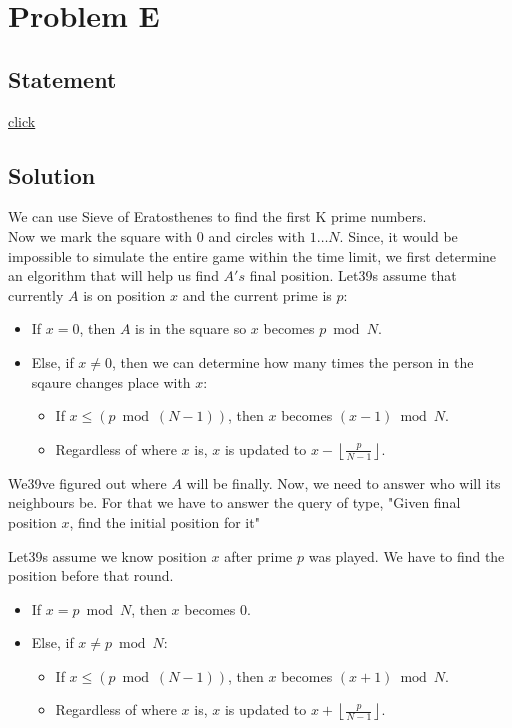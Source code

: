 \section{Problem E}
	\subsection{Statement}
		\href{http://foobar.iiitd.edu.in/contest/team/problem.php?id=531}{click}

	\subsection{Solution}
		We can use Sieve of Eratosthenes to find the first K prime numbers.\\

		Now we mark the square with $0$ and circles with $1 \ldots N$. Since, it would be impossible to simulate the entire game within the time limit, we first determine an elgorithm that will help us find $A's$ final position. Let\char39s assume that currently $A$ is on position $x$ and the current prime is $p$:
		\begin{itemize}
			\item If $x = 0$, then $A$ is in the square so $x$ becomes $p \bmod N$.
			\item Else, if $x \neq 0$, then we can determine how many times the person in the sqaure changes place with $x$:
				\begin{itemize}
					\item If $x \leq (p \bmod (N-1))$, then $x$ becomes $(x-1) \bmod N$.
					\item Regardless of where $x$ is, $x$ is updated to $x - \left\lfloor\frac{p}{N-1}\right\rfloor$.
				\end{itemize}
		\end{itemize}

		We\char39ve figured out where $A$ will be finally. Now, we need to answer who will its neighbours be. For that we have to answer the query of type, "Given final position $x$, find the initial position for it"

		Let\char39s assume we know position $x$ after prime $p$ was played. We have to find the position before that round.
		\begin{itemize}
			\item If $x = p \bmod N$, then $x$ becomes $0$.
			\item Else, if $x \neq p \bmod N$:
				\begin{itemize}
					\item If $x \leq (p \bmod (N-1))$, then $x$ becomes $(x+1) \bmod N$.
					\item Regardless of where $x$ is, $x$ is updated to $x + \left\lfloor\frac{p}{N-1}\right\rfloor$.
				\end{itemize}
		\end{itemize}